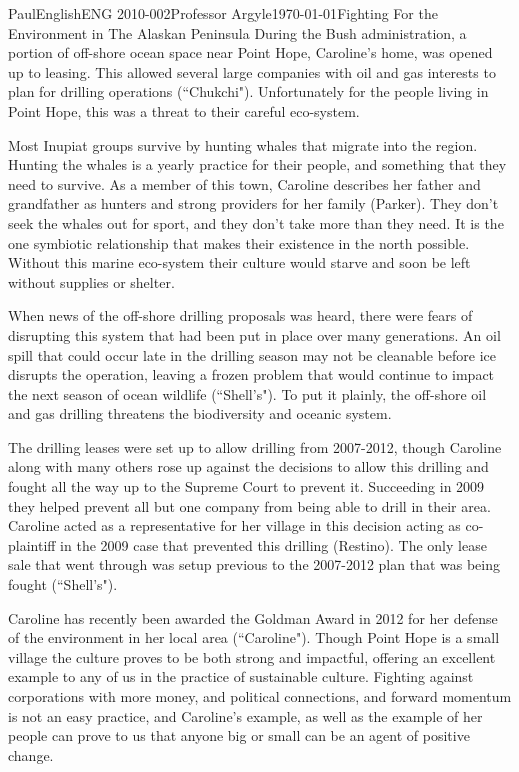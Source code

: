 \documentclass[12pt,letterpaper]{article}
\begin{document}
\begin{mla}{Paul}{English}{ENG 2010-002}{Professor Argyle}{\today}{Fighting For the Environment in The Alaskan Peninsula}
During the Bush administration, a portion of off-shore ocean space near Point Hope, Caroline's home, was opened up to leasing. This allowed several large companies with oil and gas interests to plan for drilling operations (``Chukchi"). Unfortunately for the people living in Point Hope, this was a threat to their careful eco-system.

Most Inupiat groups survive by hunting whales that migrate into the region. Hunting the whales is a yearly practice for their people, and something that they need to survive. As a member of this town, Caroline describes her father and grandfather as hunters and strong providers for her family (Parker). They don't seek the whales out for sport, and they don't take more than they need. It is the one symbiotic relationship that makes their existence in the north possible. Without this marine eco-system their culture would starve and soon be left without supplies or shelter.

When news of the off-shore drilling proposals was heard, there were fears of disrupting this system that had been put in place over many generations. An oil spill that could occur late in the drilling season may not be cleanable before ice disrupts the operation, leaving a frozen problem that would continue to impact the next season of ocean wildlife (``Shell's"). To put it plainly, the off-shore oil and gas drilling threatens the biodiversity and oceanic system.

The drilling leases were set up to allow drilling from 2007-2012, though Caroline along with many others rose up against the decisions to allow this drilling and fought all the way up to the Supreme Court to prevent it. Succeeding in 2009 they helped prevent all but one company from being able to drill in their area. Caroline acted as a representative for her village in this decision acting as co-plaintiff in the 2009 case that prevented this drilling (Restino). The only lease sale that went through was setup previous to the 2007-2012 plan that was being fought (``Shell's").

Caroline has recently been awarded the Goldman Award in 2012 for her defense of the environment in her local area (``Caroline"). Though Point Hope is a small village the culture proves to be both strong and impactful, offering an excellent example to any of us in the practice of sustainable culture. Fighting against corporations with more money, and political connections, and forward momentum is not an easy practice, and Caroline's example, as well as the example of her people can prove to us that anyone big or small can be an agent of positive change. 


\end{mla}
\end{document}
